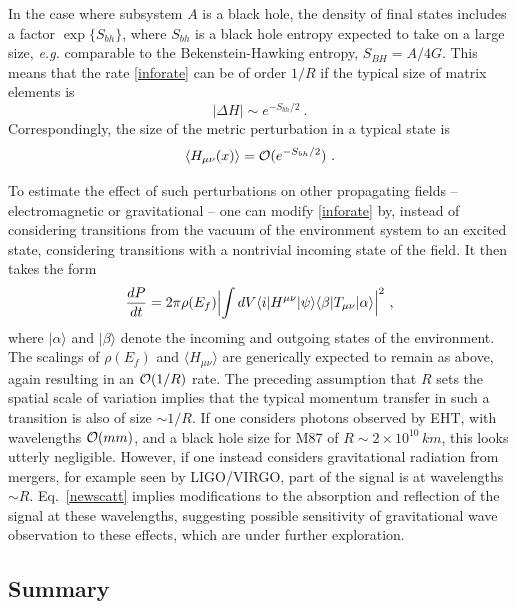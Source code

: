 \documentclass[12pt]{article}
\numberwithin{equation}{section}
\newcommand{\calo}{{\cal O}}
\newcommand{\beq}{\begin{equation}}
\newcommand{\eeq}{\end{equation}}
\begin{document}
In the case where subsystem $A$ is a black hole, the density of final states includes a factor $\exp\{S_{bh}\}$, where $S_{bh}$ is a black hole entropy expected to take on a large size, {\it e.g.} comparable to the Bekenstein-Hawking entropy, $S_{BH}=A/4G$.  This means that the rate \eqref{inforate} can be of order $1/R$ if the typical size of matrix elements is\cite{NVU}
\beq
|\Delta H|\sim e^{-S_{bh}/2}\ .
\eeq
Correspondingly, the  size of the metric perturbation in a typical state is
\beq\label{incmet}
\langle H_{\mu\nu}(x)\rangle ={\cal O}(e^{-S_{bh}/2})\ .
\eeq

To estimate the effect of such perturbations on other propagating fields -- electromagnetic or gravitational -- one can modify \eqref{inforate} by, instead of considering transitions from the vacuum of the environment system to an excited state, considering transitions with a nontrivial incoming state of the field.  It then takes the form
\beq\label{newscatt}
\frac{dP}{dt}=2\pi\rho(E_f) \Bigl|\int dV \langle i| H^{\mu\nu}|\psi\rangle\langle \beta| T_{\mu\nu}|\alpha\rangle\Bigr|^2\ ,
\eeq
where $|\alpha\rangle$ and $|\beta\rangle$ denote the incoming and outgoing states of the environment.  The scalings of $\rho(E_f)$ and $\langle H_{\mu\nu}\rangle$ are generically expected to remain as above, again resulting in an $\calo(1/R)$ rate.  
The preceding assumption that $R$ sets the spatial scale of variation implies that the typical momentum transfer in such a transition is also of size $\sim 1/R$.  If one considers photons observed by EHT, with wavelengths $\calo(mm)$, and a black hole size for M87 of $R\sim 2\times 10^{10}\, km$, this looks utterly negligible.  However, if one instead considers gravitational radiation from mergers, for example seen by LIGO/VIRGO, part of the signal is at wavelengths $\sim R$.  Eq.~\eqref{newscatt} implies modifications to the absorption and reflection of the signal at these wavelengths, suggesting possible sensitivity of gravitational wave observation to these effects\cite{SGsearch}\cite{BHQU}, which are under further exploration.

\subsection{Summary}
\end{document}
